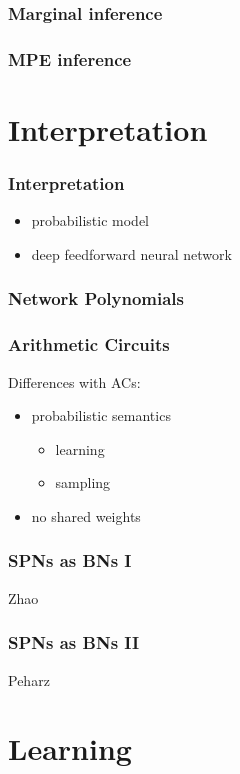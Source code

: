 \documentclass[xcolor={usenames,dvipsnames,svgnames}, compress]{beamer}
\begin{document}
\begin{frame}
  \frametitle{Marginal inference}
\end{frame}

\begin{frame}
  \frametitle{MPE inference}
\end{frame}


\section{Interpretation}
{
  \begin{frame}
    \sectionpage
  \end{frame}
}

\begin{frame}
\frametitle{Interpretation}
\begin{itemize}
\item probabilistic model
\item deep feedforward neural network
\end{itemize}
\end{frame}


\begin{frame}
\frametitle{Network Polynomials}
\end{frame}

\begin{frame}
  \frametitle{Arithmetic Circuits}
  Differences with ACs:
  \begin{itemize}
  \item probabilistic semantics
    \begin{itemize}
    \item learning
      \item sampling
    \end{itemize}
    \item no shared weights
  \end{itemize}
\end{frame}

\begin{frame}
  \frametitle{SPNs as BNs I}
  Zhao
\end{frame}

\begin{frame}
  \frametitle{SPNs as BNs II}
  Peharz
\end{frame}


\section{Learning}
{
  \begin{frame}
    \sectionpage
  \end{frame}
}
\end{document}

